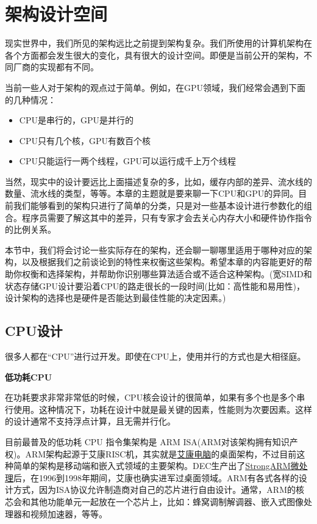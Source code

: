 \section{架构设计空间}

现实世界中，我们所见的架构远比之前提到架构复杂。我们所使用的计算机架构在各个方面都会发生很大的变化，具有很大的设计空间。即便是当前公开的架构，不同厂商的实现都有不同。

当前一些人对于架构的观点过于简单。例如，在GPU领域，我们经常会遇到下面的几种情况：

\begin{itemize}
\item CPU是串行的，GPU是并行的
\item CPU只有几个核，GPU有数百个核
\item CPU只能运行一两个线程，GPU可以运行成千上万个线程
\end{itemize}

当然，现实中的设计要远比上面描述复杂的多，比如，缓存内部的差异、流水线的数量、流水线的类型，等等。本章的主题就是要来聊一下CPU和GPU的异同。目前我们能够看到的架构只进行了简单的分类，只是对一些基本设计进行参数化的组合。程序员需要了解这其中的差异，只有专家才会去关心内存大小和硬件协作指令的比例关系。

本节中，我们将会讨论一些实际存在的架构，还会聊一聊哪里适用于哪种对应的架构，以及根据我们之前谈论到的特性来权衡这些架构。希望本章的内容能更好的帮助你权衡和选择架构，并帮助你识别哪些算法适合或不适合这种架构。(宽SIMD和状态存储GPU设计要沿着CPU的路走很长的一段时间(比如：高性能和易用性)，设计架构的选择也是硬件是否能达到最佳性能的决定因素。)

\subsection{CPU设计}

很多人都在“CPU”进行过开发。即使在CPU上，使用并行的方式也是大相径庭。

\textbf{低功耗CPU}

在功耗要求非常非常低的时候，CPU核会设计的很简单，如果有多个也是多个串行使用。这种情况下，功耗在设计中就是最关键的因素，性能则为次要因素。这样的设计通常不支持浮点计算，且无需并行化。

目前最普及的低功耗 CPU 指令集架构是 ARM ISA(ARM对该架构拥有知识产权)。ARM架构起源于艾康RISC机，其实就是\href{https://zh.wikipedia.org/wiki/\%E8\%89\%BE\%E5\%BA\%B7\%E9\%9B\%BB\%E8\%85\%A6}{艾康电脑}的桌面架构，不过目前这种简单的架构是移动端和嵌入式领域的主要架构。DEC生产出了\href{https://zh.wikipedia.org/wiki/StrongARM}{StrongARM微处理}后，在1996到1998年期间，艾康也确实进军过桌面领域。ARM有各式各样的设计方式，因为ISA协议允许制造商对自己的芯片进行自由设计。通常，ARM的核芯会和其他功能单元一起放在一个芯片上，比如：蜂窝调制解调器、嵌入式图像处理器和视频加速器，等等。

